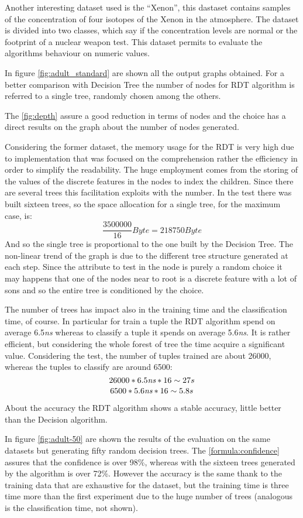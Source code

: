 \documentclass{acm_proc_article-sp-sigmod07}
\begin{document}
Another interesting dataset used is the ``Xenon'', this dastaset contains
samples of the concentration of four isotopes of the Xenon in the
atmosphere. The dataset is divided into two classes, which say if the
concentration levels are normal or the footprint of a nuclear weapon test.
This dataset permits to evaluate the algorithms behaviour on numeric
values.

In figure \ref{fig:adult_standard} are shown all the output graphs
obtained.  For a better comparison with Decision Tree the number of nodes
for RDT algorithm is referred to a single tree, randomly chosen among the
others.

The \ref{fig:depth} assure a good reduction in terms of nodes and the
choice has a direct results on the graph about the number of nodes
generated.

Considering the former dataset, the memory usage for the RDT is very high
due to implementation that was focused on the comprehension rather the
efficiency in order to simplify the readability. The huge employment comes
from the storing of the values of the discrete features in the nodes to
index the children. Since there are several trees this facilitation
exploits with the number. In the test there was built sixteen trees, so the
space allocation for a single tree, for the maximum case, is:
$$ \frac{3500000}{16} Byte = 218750 Byte$$
And so the single tree is proportional to the one built by the Decision
Tree. The non-linear trend of the graph is due to the different tree
structure generated at each step. Since the attribute to test in the node
is purely a random choice it may happens that one of the nodes near to
root is a discrete feature with a lot of sons and so the entire tree is
conditioned by the choice.

The number of trees has impact also in the training time and the
classification time, of course. In particular for train a tuple the RDT
algorithm spend on average 6.5\emph{ns} whereas to classify a tuple it
spends on average 5.6\emph{ns}. It is rather efficient, but considering
the whole forest of tree the time acquire a significant value. Considering
the test, the number of tuples trained are about 26000, whereas the tuples
to classify are around 6500:
$$
26000 * 6.5\emph{ns} * 16 \sim 27 s
$$
$$
 6500 * 5.6\emph{ns} * 16 \sim 5.8 s
$$

About the accuracy the RDT algorithm shows a stable accuracy, little
better than the Decision algorithm.

In figure \ref{fig:adult-50} are shown the results of the evaluation on
the same datasets but generating fifty random decision trees. The
\ref{formula:confidence} assures that the confidence is over 98\%, whereas
with the sixteen trees generated  by the algorithm is over 72\%. However
the accuracy is the same thank to the training data that are exhaustive
for the dataset, but the training time is three time more than the first
experiment due to the huge number of trees (analogous is the
classification time, not shown).
\end{document}
